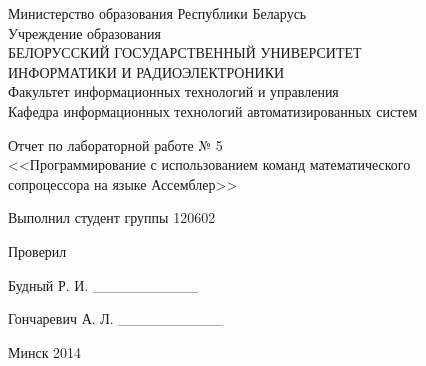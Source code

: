 \thispagestyle{empty}
\setlength{\parindent}{0ex} %

\begin{center}
  Министерство образования Республики Беларусь \\
  \vspace{0.5ex}
  Учреждение образования \\
  БЕЛОРУССКИЙ ГОСУДАРСТВЕННЫЙ УНИВЕРСИТЕТ \\
  ИНФОРМАТИКИ И РАДИОЭЛЕКТРОНИКИ \\
  \vspace{0.5ex}
  Факультет информационных технологий и управления \\
  \vspace{0.5ex}
  Кафедра информационных технологий автоматизированных систем
\end{center}

\vspace{50mm}

\begin{center}
  Отчет по лабораторной работе № 5 \\
  <<Программирование с использованием команд математического \\ сопроцессора на языке Ассемблер>>
\end{center}

\vspace{40mm}

\begin{minipage}{.55\linewidth}
    Выполнил студент группы 120602

    \smallskip

    Проверил
\end{minipage}
\hfill
\begin{minipage}{.4\linewidth}
  \begin{flushright}
    Будный Р. И. \_\_\_\_\_\_\_\_\_\_

    \smallskip

    Гончаревич А. Л. \_\_\_\_\_\_\_\_\_\_
  \end{flushright}
\end{minipage}

\vspace{65mm}
\begin{center}
  Минск 2014
\end{center}

\setlength{\parindent}{1.25cm} %

\newpage
